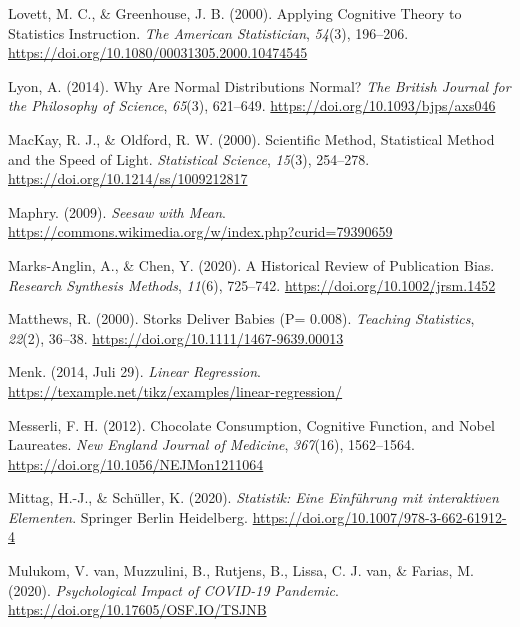 \documentclass[
  a4paper,
]{scrbook}
\newlength{\cslhangindent}
\newenvironment{CSLReferences}[2] %
 {\begin{list}{}{%
  \setlength{\itemindent}{0pt}
  \setlength{\leftmargin}{0pt}
  \setlength{\parsep}{0pt}
  \ifodd #1
   \setlength{\leftmargin}{\cslhangindent}
   \setlength{\itemindent}{-1\cslhangindent}
  \fi
  \setlength{\itemsep}{#2\baselineskip}}}
 {\end{list}}
\theoremstyle{definition}
\theoremstyle{definition}
\theoremstyle{definition}
\theoremstyle{remark}
\begin{document}
\begin{CSLReferences}{1}{0}
Lovett, M. C., \& Greenhouse, J. B. (2000). Applying {Cognitive Theory}
to {Statistics Instruction}. \emph{The American Statistician},
\emph{54}(3), 196--206.
\url{https://doi.org/10.1080/00031305.2000.10474545}

Lyon, A. (2014). Why Are {Normal Distributions Normal}? \emph{The
British Journal for the Philosophy of Science}, \emph{65}(3), 621--649.
\url{https://doi.org/10.1093/bjps/axs046}

MacKay, R. J., \& Oldford, R. W. (2000). Scientific {Method},
{Statistical Method} and the {Speed} of {Light}. \emph{Statistical
Science}, \emph{15}(3), 254--278.
\url{https://doi.org/10.1214/ss/1009212817}

Maphry. (2009). \emph{Seesaw with Mean}.
\url{https://commons.wikimedia.org/w/index.php?curid=79390659}

Marks‐Anglin, A., \& Chen, Y. (2020). A Historical Review of Publication
Bias. \emph{Research Synthesis Methods}, \emph{11}(6), 725--742.
\url{https://doi.org/10.1002/jrsm.1452}

Matthews, R. (2000). Storks {Deliver Babies} (P= 0.008). \emph{Teaching
Statistics}, \emph{22}(2), 36--38.
\url{https://doi.org/10.1111/1467-9639.00013}

Menk. (2014, Juli 29). \emph{Linear Regression}.
\url{https://texample.net/tikz/examples/linear-regression/}

Messerli, F. H. (2012). Chocolate {Consumption}, {Cognitive Function},
and {Nobel Laureates}. \emph{New England Journal of Medicine},
\emph{367}(16), 1562--1564. \url{https://doi.org/10.1056/NEJMon1211064}

Mittag, H.-J., \& Schüller, K. (2020). \emph{Statistik: Eine Einführung
mit interaktiven Elementen}. Springer Berlin Heidelberg.
\url{https://doi.org/10.1007/978-3-662-61912-4}

Mulukom, V. van, Muzzulini, B., Rutjens, B., Lissa, C. J. van, \&
Farias, M. (2020). \emph{Psychological Impact of {COVID-19} Pandemic}.
\url{https://doi.org/10.17605/OSF.IO/TSJNB}


\end{CSLReferences}
\end{document}
